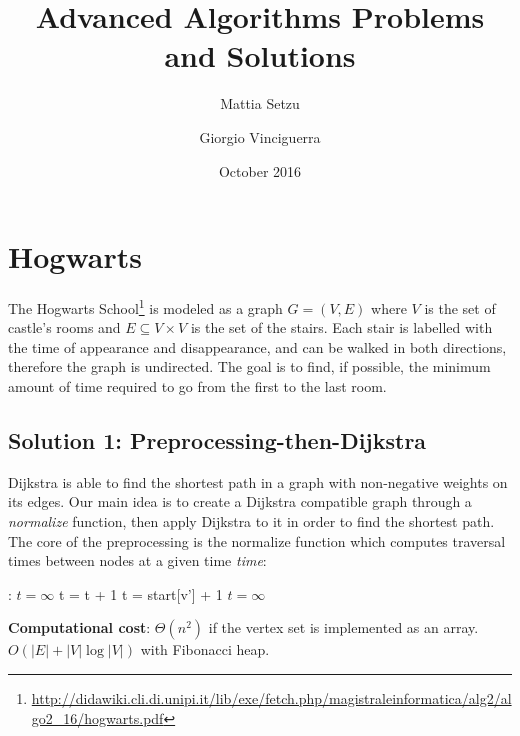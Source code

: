 \documentclass{article}
\title{Advanced Algorithms Problems and Solutions}
\author{Mattia Setzu \and Giorgio Vinciguerra}
\date{October 2016}
\begin{document}
\maketitle

\tableofcontents
\clearpage

\section{Hogwarts}

The Hogwarts School\footnote{\url{http://didawiki.cli.di.unipi.it/lib/exe/fetch.php/magistraleinformatica/alg2/algo2_16/hogwarts.pdf}}
is modeled as a graph $G=(V, E)$ where $V$ is the set of castle's rooms and $E \subseteq V \times V$
is the set of the stairs.
Each stair is labelled with the time of appearance and disappearance, and can be
walked in both directions, therefore the graph is undirected.
The goal is to find, if possible, the minimum amount of time required to go from
the first to the last room.

\subsection{Solution 1: Preprocessing-then-Dijkstra}

Dijkstra is able to find the shortest path in a graph with non-negative weights
on its edges.
Our main idea is to create a Dijkstra compatible graph through a \emph{normalize}
function, then apply Dijkstra to it in order to find the shortest path.
The core of the preprocessing is the normalize function which computes traversal
times between nodes at a given time \emph{time}:

\begin{algorithmic}[1]
  :
    \State $t = \infty$
    \State {}    
        \State t = t + 1\;
    \State {}              
      \State t = start[v'] + 1\;
    \State \Else
      \State $t = \infty$\;                     
    \EndIf \\
    \EndFunction
\end{algorithmic}

\begin{framed}
  \noindent
  \textbf{Computational cost}: $\Theta(n^{2})$ if the vertex set is implemented
  as an array. $O(|E|+|V|\log |V|)$ with Fibonacci heap.
\end{framed}
\end{document}
